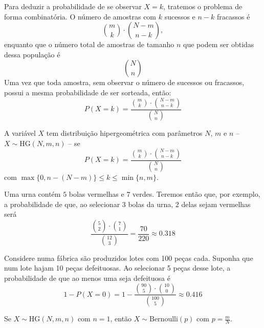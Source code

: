 Para deduzir a probabilidade de se observar $X = k$, tratemos o problema de forma
combinatória.
O número de amostras com $k$ sucessos e $n-k$ fracassos é
\[
    \binom{m}{k} \cdot \binom{N-m}{n-k},
\]
enquanto que o número total de amostras de tamanho $n$ que podem ser obtidas dessa
população é
\[
    \binom{N}{n}
\]
Uma vez que toda amostra, sem observar o número de sucessos ou fracassos, possui a mesma
probabilidade de ser sorteada, então:
\[
    P(X = k) = \frac{\binom{m}{k} \cdot \binom{N-m}{n-k}}{\binom{N}{n}}
\]

\begin{def:hipergeometrica}
A variável $X$ tem distribuição hipergeométrica com parâmetros $N$, $m$ e $n$
-- $X \sim \mathrm{HG}(N, m, n)$ -- se
\[
    P(X = k) = \frac{\binom{m}{k} \cdot \binom{N-m}{n-k}}{\binom{N}{n}}
\]
com $\max\{0, n-(N-m)\} \le k \le \min\{n, m\}$.
\end{def:hipergeometrica}

\begin{exp:hipergeometrica 1}
Uma urna contém $5$ bolas vermelhas e $7$ verdes.
Teremos então que, por exemplo, a probabilidade de que, ao selecionar $3$ bolas da urna,
$2$ delas sejam vermelhas será
\[
    \frac{\binom{5}{2} \cdot \binom{7}{1}}{\binom{12}{3}} = \frac{70}{220} \approx 0.318
\]
\end{exp:hipergeometrica 1}

\begin{exp:hipergeometrica 2}
Considere numa fábrica são produzidos lotes com 100 peças cada.
Suponha que num lote hajam 10 peças defeituosas.
Ao selecionar 5 peças desse lote, a probabilidade de que ao menos uma seja defeituosa é
\[
    1 - P(X = 0) = 1 - \frac{\binom{90}{5} \cdot \binom{10}{0}}{\binom{100}{5}} \approx 0.416
\]
\end{exp:hipergeometrica 2}

\begin{obs:hipergeometrica 1}
Se $X \sim \mathrm{HG}(N, m, n)$ com $n = 1$, então $X \sim \mathrm{Bernoulli}(p)$ com
$p = \frac{m}{N}$.
\end{obs:hipergeometrica 1}

